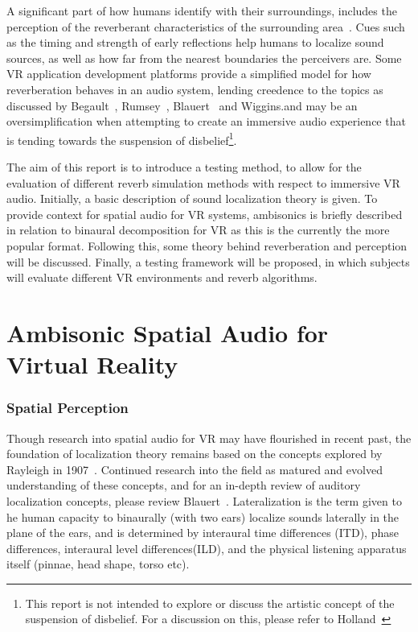 \documentclass[paper=a4, fontsize=10pt, font=arial]{scrartcl} %
\numberwithin{equation}{section} %
\numberwithin{figure}{section} %
\numberwithin{table}{section} %
\begin{document}
A significant part of how humans identify with their surroundings, includes the perception of the reverberant characteristics of the surrounding area~\cite{rumsey2012spatial}. 
Cues such as the timing and strength of early reflections help humans to localize sound sources, as well as how far from the nearest boundaries the perceivers are. 
Some VR application development platforms provide a simplified model for how reverberation behaves in an audio system, lending creedence to the topics as discussed by Begault~\cite{Begault1995}, Rumsey~\cite{rumsey2012spatial}, Blauert~\cite{Blauert1997} and Wiggins\cite{Wiggins2004}.and may be an oversimplification when attempting to create an immersive audio experience that is tending towards the suspension of disbelief\footnote{This report is not intended to explore or discuss the artistic concept of the suspension of disbelief. For a discussion on this, please refer to Holland~\cite{Holland2003}}.\par

The aim of this report is to introduce a testing method, to allow for the evaluation of different reverb simulation methods with respect to immersive VR audio. 
Initially, a basic description of sound localization theory is given. 
To provide context for spatial audio for VR systems, ambisonics is briefly described in relation to binaural decomposition for VR as this is the currently the more popular format. 
Following this, some theory behind reverberation and perception will be discussed.
Finally, a testing framework will be proposed, in which subjects will evaluate different VR environments and reverb algorithms.

\newpage

\section{Ambisonic Spatial Audio for Virtual Reality}
\subsubsection{Spatial Perception}

Though  research into spatial audio for VR may have flourished in recent past, the foundation of localization theory remains based on the concepts explored by Rayleigh in 1907~\cite{Blauert1997}. Continued research into the field as matured and evolved understanding of these concepts, and for an in-depth review of auditory localization concepts, please review Blauert~\cite{Blauert1997}. Lateralization is the term given to he human capacity to binaurally (with two ears) localize sounds laterally in the plane of the ears, and is determined by interaural time differences (ITD), phase differences, interaural level differences(ILD), and the physical listening apparatus itself (pinnae, head shape, torso etc).
\end{document}
